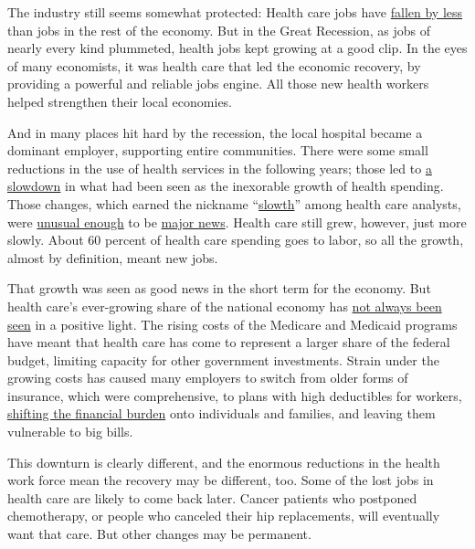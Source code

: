 The industry still seems somewhat protected: Health care jobs have
\href{https://twitter.com/Altarum_SHSS/status/1258745215382413312}{fallen
by less} than jobs in the rest of the economy. But in the Great
Recession, as jobs of nearly every kind plummeted, health jobs kept
growing at a good clip. In the eyes of many economists, it was health
care that led the economic recovery, by providing a powerful and
reliable jobs engine. All those new health workers helped strengthen
their local economies.

And in many places hit hard by the recession, the local hospital became
a dominant employer, supporting entire communities. There were some
small reductions in the use of health services in the following years;
those led to
\href{https://www.nytimes3xbfgragh.onion/2014/08/28/upshot/medicare-not-such-a-budget-buster-anymore.html}{a
slowdown} in what had been seen as the inexorable growth of health
spending. Those changes, which earned the nickname
``\href{https://www.advisory.com/daily-briefing/blog/2014/03/health-care-slowth-continues}{slowth}''
among health care analysts, were
\href{https://www.nytimes3xbfgragh.onion/2014/12/04/upshot/good-news-inside-the-health-spending-numbers.html}{unusual
enough} to be
\href{https://www.nytimes3xbfgragh.onion/2013/01/08/us/health-spending-growth-stays-low-for-third-straight-year.html}{major
news}. Health care still grew, however, just more slowly. About 60
percent of health care spending goes to labor, so all the growth, almost
by definition, meant new jobs.

That growth was seen as good news in the short term for the economy. But
health care's ever-growing share of the national economy has
\href{http://www.sangerkatz.com/uploads/1/5/0/0/15005400/cover_story-the_false_promise.pdf}{not
always been seen} in a positive light. The rising costs of the Medicare
and Medicaid programs have meant that health care has come to represent
a larger share of the federal budget, limiting capacity for other
government investments. Strain under the growing costs has caused many
employers to switch from older forms of insurance, which were
comprehensive, to plans with high deductibles for workers,
\href{https://www.nytimes3xbfgragh.onion/2019/09/25/health/employer-health-insurance-cost.html}{shifting
the financial burden} onto individuals and families, and leaving them
vulnerable to big bills.

This downturn is clearly different, and the enormous reductions in the
health work force mean the recovery may be different, too. Some of the
lost jobs in health care are likely to come back later. Cancer patients
who postponed chemotherapy, or people who canceled their hip
replacements, will eventually want that care. But other changes may be
permanent.

